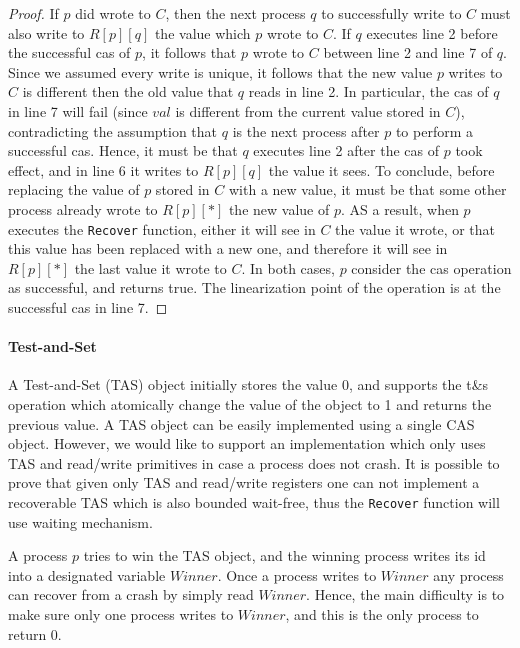 \begin{proof}
	If $p$ did wrote to $C$, then the next process $q$ to successfully write to $C$ must also write to $R[p][q]$ the value which $p$ wrote to $C$. If $q$ executes line 2 before the successful cas of $p$, it follows that $p$ wrote to $C$ between line 2 and line 7 of $q$. Since we assumed every write is unique, it follows that the new value $p$ writes to $C$ is different then the old value that $q$ reads in line 2. In particular, the cas of $q$ in line 7 will fail (since $val$ is different from the current value stored in $C$), contradicting the assumption that $q$ is the next process after $p$ to perform a successful cas. Hence, it must be that $q$ executes line 2 after the cas of $p$ took effect, and in line 6 it writes to $R[p][q]$ the value it sees. To conclude, before replacing the value of $p$ stored in $C$ with a new value, it must be that some other process already wrote to $R[p][*]$ the new value of $p$. AS a result, when $p$ executes the \texttt{Recover} function, either it will see in $C$ the value it wrote, or that this value has been replaced with a new one, and therefore it will see in $R[p][*]$ the last value it wrote to $C$. In both cases, $p$ consider the cas operation as successful, and returns true. The linearization point of the operation is at the successful cas in line 7.
	 
\end{proof}

\paragraph*{Test-and-Set}

A Test-and-Set (TAS) object initially stores the value 0, and supports the t\&s operation which atomically change the value of the object to 1 and returns the previous value. A TAS object can be easily implemented using a single CAS object. However, we would like to support an implementation which only uses TAS and read/write primitives in case a process does not crash. It is possible to prove that given only TAS and read/write registers one can not implement a recoverable TAS which is also bounded wait-free, thus the \texttt{Recover} function will use waiting mechanism.

A process $p$ tries to win the TAS object, and the winning process writes its id into a designated variable $Winner$. Once a process writes to $Winner$ any process can recover from a crash by simply read $Winner$. Hence, the main difficulty is to make sure only one process writes to $Winner$, and this is the only process to return 0.

